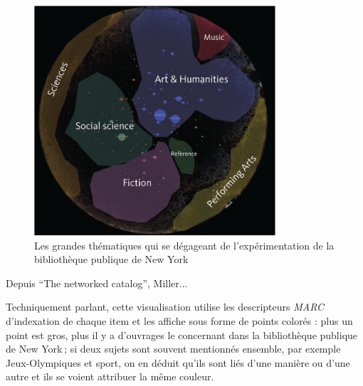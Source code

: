 \begin{figure}[h!]
	\centering
	\includegraphics[width=0.8\textwidth]{images/image12.png}
	\caption{Les grandes thématiques qui se dégageant de l'expérimentation de la bibliothèque publique de New York}
	\label{fig:image12}
\end{figure}

\begin{center}
	Depuis \enquote{The networked catalog}, Miller...
\end{center}


Techniquement parlant, cette visualisation utilise les descripteurs \textit{MARC} d’indexation de chaque item et les affiche sous forme de points colorés : plus un point est gros, plus il y a d’ouvrages le concernant dans la bibliothèque publique de New York ; si deux sujets sont souvent mentionnés ensemble, par exemple Jeux-Olympiques et sport, on en déduit qu’ils sont liés d’une manière ou d’une autre et ils se voient attribuer la même couleur.

